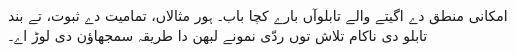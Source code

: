 \documentclass[../../../include/open-logic-chapter]{subfiles}
\begin{document}

\begin{editorial}
  امکانی منطق دے اگیتے والے تابلوآں بارے کچا باب۔ ہور مثالاں، تمامیت دے ثبوت، تے بند تابلو دی ناکام تلاش توں ردّی نمونے لبھن دا طریقہ سمجھاؤن دی لوڑ اے۔
\end{editorial}


\OLEndChapterHook
\end{document}
